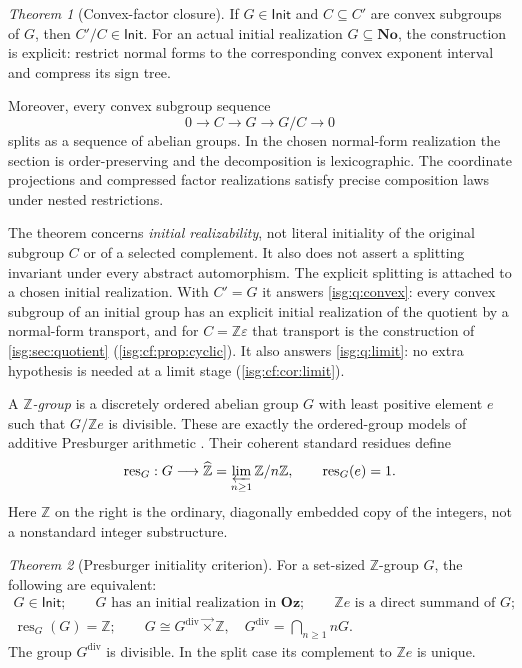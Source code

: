 \documentclass[11pt]{article}
\theoremstyle{definition}
\theoremstyle{remark}
\newtheorem{maintheorem}{Theorem}
\newcommand{\No}{\ensuremath{\mathbf{No}}}
\newcommand{\Oz}{\ensuremath{\mathbf{Oz}}}
\newcommand{\Z}{\mathbb{Z}}
\newcommand{\lex}{\mathbin{\overrightarrow{\times}}}
\newcommand{\Zhat}{\widehat{\Z}}
\newcommand{\IR}{\mathsf{Init}}
\newcommand{\res}{\operatorname{res}}
\newcommand{\dv}{\mathrm{div}}
\begin{document}
\begin{maintheorem}[Convex-factor closure]\label{isg:cf:main:factor}
If $G\in\IR$ and $C\subseteq C'$ are convex subgroups of $G$, then
$C'/C\in\IR$. For an actual initial realization $G\subseteq\No$, the
construction is explicit: restrict normal forms to the corresponding
convex exponent interval and compress its sign tree.

Moreover, every convex subgroup sequence
\[
 0\longrightarrow C\longrightarrow G\longrightarrow G/C
 \longrightarrow0
\]
splits as a sequence of abelian groups. In the chosen normal-form
realization the section is order-preserving and the decomposition is
lexicographic. The coordinate projections and compressed factor
realizations satisfy precise composition laws under nested restrictions.
\end{maintheorem}

The theorem concerns \emph{initial realizability}, not literal initiality
of the original subgroup $C$ or of a selected complement. It also does
not assert a splitting invariant under every abstract automorphism.
The explicit splitting is attached to a chosen initial realization.
With $C'=G$ it answers \cref{isg:q:convex}: every convex subgroup of an
initial group has an explicit initial realization of the quotient by a
normal-form transport, and for $C=\Z\varepsilon$ that transport is the
construction of \cref{isg:sec:quotient}
(\cref{isg:cf:prop:cyclic}). It also answers \cref{isg:q:limit}: no
extra hypothesis is needed at a limit stage (\cref{isg:cf:cor:limit}).

A \emph{$\Z$-group} is a discretely ordered abelian group $G$ with least
positive element $e$ such that $G/\Z e$ is divisible. These are exactly
the ordered-group models of additive Presburger arithmetic
\cite{Jerabek}. Their coherent standard residues define
\[
 \res_G:G\longrightarrow\Zhat=\varprojlim_{n\ge1}\Z/n\Z,
 \qquad \res_G(e)=1.
\]
Here $\Z$ on the right is the ordinary, diagonally embedded copy of the
integers, not a nonstandard integer substructure.

\begin{maintheorem}[Presburger initiality criterion]\label{isg:cf:main:presburger}
For a set-sized $\Z$-group $G$, the following are equivalent:
\[
\begin{gathered}
 G\in\IR;\qquad
 G\text{ has an initial realization in }\Oz;\qquad
 \Z e\text{ is a direct summand of }G;\\
 \res_G(G)=\Z;\qquad
 G\cong G^{\dv}\lex\Z,\quad G^{\dv}=\bigcap_{n\ge1}nG.
\end{gathered}
\]
The group $G^{\dv}$ is divisible. In the split case its complement to
$\Z e$ is unique.
\end{maintheorem}
\end{document}
